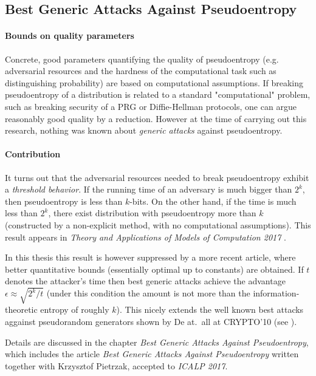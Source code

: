 \documentclass[12pt]{report}
\begin{document}
\subsection{Best Generic Attacks Against Pseudoentropy}

\paragraph{Bounds on quality parameters}
Concrete, good parameters quantifying the quality of pseudoentropy (e.g. adversarial resources and the hardness of the computational task such as distinguishing probability) are based on computational assumptions. 
If breaking pseudoentropy of a distribution is related to a standard "computational" problem, such as breaking security of a PRG or Diffie-Hellman protocols, one can argue reasonably good quality by a reduction. However at the time of carrying out this research, nothing was known about \emph{generic attacks} against pseudoentropy.

\paragraph{Contribution}

It turns out that the adversarial resources needed to break pseudoentropy exhibit a \emph{threshold behavior}.
If the running time of an adversary is much bigger than $2^k$, then pseudoentropy is less than $k$-bits. On the other hand,
if the time is much less than $2^k$, there exist distribution with pseudoentropy more than $k$ (constructed by a non-explicit method, with no computational assumptions). This result appears in \emph{Theory and Applications of Models of Computation 2017}
\cite{Sko2017b}. 

In this thesis this result is however suppressed by a more recent article, where better quantitative bounds (essentially optimal up to constants) are obtained. If $t$ denotes the attacker's time 
then best generic attacks achieve the advantage $ \epsilon \approx \sqrt{2^k /t}$
(under this condition the amount is not more than the information-theoretic entropy of roughly $k$). This nicely extends the well known {best attacks aggainst pseudorandom generators} shown by De at.\ all at CRYPTO'10 (see \cite{DBLP:conf/crypto/DeTT10}).

Details are discussed in the chapter \emph{Best Generic Attacks Against
Pseudoentropy}, which includes the article \emph{Best Generic Attacks Against Pseudoentropy} written together with Krzysztof Pietrzak, accepted to \emph{ICALP 2017}.
\end{document}
